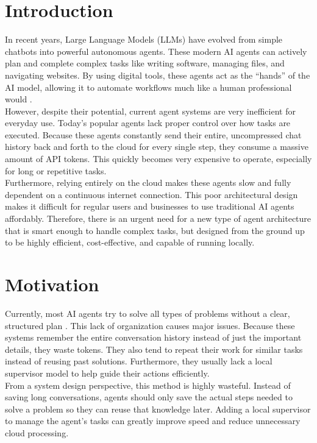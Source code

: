 \section{Introduction}
In recent years, Large Language Models (LLMs) have evolved from simple chatbots into powerful autonomous agents. These modern AI agents can actively plan and complete complex tasks like writing software, managing files, and navigating websites. By using digital tools, these agents act as the ``hands'' of the AI model, allowing it to automate workflows much like a human professional would \cite{agent_survey}.\\

However, despite their potential, current agent systems are very inefficient for everyday use. Today's popular agents lack proper control over how tasks are executed. Because these agents constantly send their entire, uncompressed chat history back and forth to the cloud for every single step, they consume a massive amount of API tokens. This quickly becomes very expensive to operate, especially for long or repetitive tasks.\\

Furthermore, relying entirely on the cloud makes these agents slow and fully dependent on a continuous internet connection. This poor architectural design makes it difficult for regular users and businesses to use traditional AI agents affordably. Therefore, there is an urgent need for a new type of agent architecture that is smart enough to handle complex tasks, but designed from the ground up to be highly efficient, cost-effective, and capable of running locally.\\


\section{Motivation}
Currently, most AI agents try to solve all types of problems without a clear, structured plan \cite{general_ai_agent1, general_ai_agent2}. This lack of organization causes major issues. Because these systems remember the entire conversation history instead of just the important details, they waste tokens. They also tend to repeat their work for similar tasks instead of reusing past solutions. Furthermore, they usually lack a local supervisor model to help guide their actions efficiently.\\

From a system design perspective, this method is highly wasteful. Instead of saving long conversations, agents should only save the actual steps needed to solve a problem so they can reuse that knowledge later. Adding a local supervisor to manage the agent's tasks can greatly improve speed and reduce unnecessary cloud processing.\\


